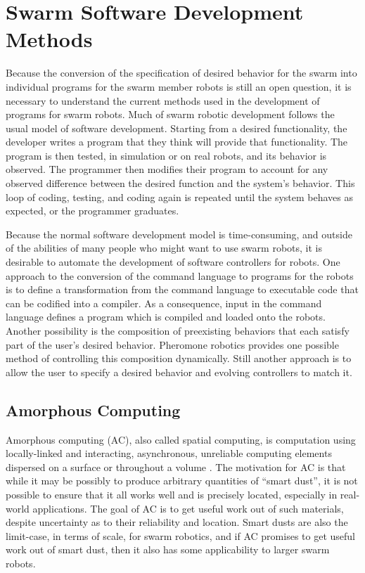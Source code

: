 \section{Swarm Software Development Methods}

Because the conversion of the specification of desired behavior for the swarm into individual programs for the swarm member robots is still an open question, it is necessary to understand the current methods used in the development of programs for swarm robots. 
Much of swarm robotic development follows the usual model of software development. 
Starting from a desired functionality, the developer writes a program that they think will provide that functionality.
The program is then tested, in simulation or on real robots, and its behavior is observed. 
The programmer then modifies their program to account for any observed difference between the desired function and the system's behavior. 
This loop of coding, testing, and coding again is repeated until the system behaves as expected, or the programmer graduates. 

Because the normal software development model is time-consuming, and outside of the abilities of many people who might want to use swarm robots, it is desirable to automate the development of software controllers for robots. 
One approach to the conversion of the command language to programs for the robots is to define a transformation from the command language to executable code that can be codified into a compiler. 
As a consequence, input in the command language defines a program which is compiled and loaded onto the robots. 
Another possibility is the composition of preexisting behaviors that each satisfy part of the user's desired behavior. 
Pheromone robotics provides one possible method of controlling this composition dynamically. 
Still another approach is to allow the user to specify a desired behavior and evolving controllers to match it. 

\subsection{Amorphous Computing}

Amorphous computing (AC), also called spatial computing, is computation using locally-linked and interacting, asynchronous, unreliable computing elements dispersed on a surface or throughout a volume \citep{abelson2000amorphous}. 
The motivation for AC is that while it may be possibly to produce arbitrary quantities of ``smart dust'', it is not possible to ensure that it all works well and is precisely located, especially in real-world applications.
The goal of AC is to get useful work out of such materials, despite uncertainty as to their reliability and location. 
Smart dusts are also the limit-case, in terms of scale, for swarm robotics, and if AC promises to get useful work out of smart dust, then it also has some applicability to larger swarm robots.

